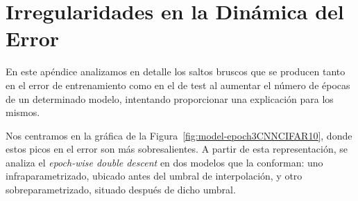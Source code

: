 
\chapter{Irregularidades en la Dinámica del Error}\label{ap:apendiceD}

En este apéndice analizamos en detalle los saltos bruscos que se producen tanto en el error de entrenamiento como en el de test al aumentar el número de épocas de un determinado modelo, intentando proporcionar una explicación para los mismos.\newline

Nos centramos en la gráfica de la Figura~\ref{fig:model-epoch3CNNCIFAR10}, donde estos picos en el error son más sobresalientes. A partir de esta representación, se analiza el \textit{epoch-wise double descent} en dos modelos que la conforman: uno infraparametrizado, ubicado antes del umbral de interpolación, y otro sobreparametrizado, situado después de dicho umbral.\newline

